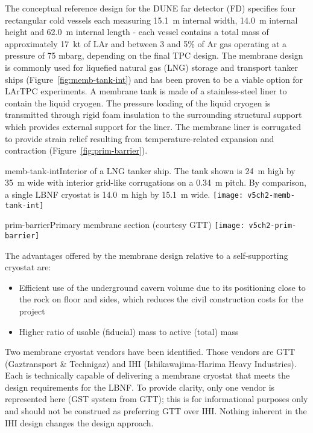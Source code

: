 The conceptual reference design for the DUNE far detector (FD) specifies four  
rectangular cold vessels each measuring 15.1~m internal width, 14.0~m internal 
height and 62.0~m internal length - each vessel contains a total mass of 
approximately 17~kt of LAr and between 3 and 5\% of Ar gas operating at a 
pressure of 75 mbarg, depending on the final TPC design. The 
membrane design is commonly 
used for liquefied natural gas (LNG) storage and transport 
tanker ships (Figure~\ref{fig:memb-tank-int}) and has been 
proven to be a viable option for LArTPC experiments. 
A membrane tank 
is made of a stainless-steel liner to contain the liquid cryogen. 
The pressure loading of the liquid cryogen is transmitted 
through rigid foam insulation to the surrounding structural support 
which provides external support for the liner. The membrane 
liner is corrugated to provide strain relief resulting from 
temperature-related expansion and contraction (Figure~\ref{fig:prim-barrier}).


\begin{cdrfigure}{memb-tank-int}{Interior of a LNG tanker ship. 
The tank shown is 24~m high by 35~m wide with interior grid-like 
corrugations on a 0.34~m pitch. By comparison, a single LBNF 
cryostat is 14.0~m high by 15.1~m wide.}
\texttt{[image: v5ch2-memb-tank-int]}
\end{cdrfigure}

\begin{cdrfigure}{prim-barrier}{Primary membrane section (courtesy GTT)}
\texttt{[image: v5ch2-prim-barrier]}
\end{cdrfigure}


The advantages offered by the membrane design relative to a self-supporting cryostat are:
\begin{itemize}
\item Efficient use of the underground cavern volume due to its positioning 
close to the rock on floor and sides, which reduces the civil construction 
costs for the project
\item Higher ratio of usable (fiducial) mass to active (total) mass
\end{itemize}

Two membrane cryostat vendors have been 
identified. Those vendors are GTT (Gaztransport \& Technigaz) and 
IHI (Ishikawajima-Harima Heavy Industries). Each is technically capable 
of delivering a membrane cryostat that meets the design requirements for 
the LBNF. To provide clarity, only one vendor is represented here (GST 
system from GTT); this is for informational purposes only and should not 
be construed as preferring GTT over IHI. Nothing inherent in the IHI 
design changes the design approach. 


